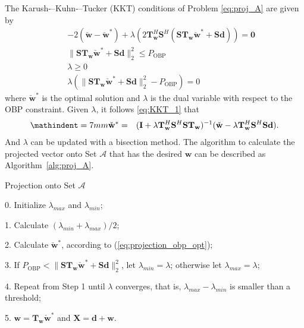 \documentclass[paper]{ieice}
\begin{document}
The Karush-–Kuhn-–Tucker (KKT) conditions \cite{ConvexOpt_Boyd} of Problem \eqref{eq:proj_A} are given by
\mathindent=0mm
\begin{eqnarray}
&&-2(\check{\mathbf{w}}-\check{\mathbf{w}}^*) + \lambda(2\mathbf{T}_{\mathbf{w}}^H\mathbf{S}^H(\mathbf{S}\mathbf{T}_{\mathbf{w}}\check{\mathbf{w}}^* + \mathbf{S}\mathbf{d})) = \mathbf{0} \label{eq:KKT_1}\\
&&\|\mathbf{S}\mathbf{T}_{\mathbf{w}}\check{\mathbf{w}}^* + \mathbf{S}\mathbf{d}\|_2^2 \leq P_{\mathrm{OBP}}\\
&&\lambda \geq 0\\
&&\lambda(\|\mathbf{S}\mathbf{T}_{\mathbf{w}}\check{\mathbf{w}}^* + \mathbf{S}\mathbf{d}\|_2^2-P_{\mathrm{OBP}}) = 0
\end{eqnarray}
where $\check{\mathbf{w}}^*$ is the optimal solution and $\lambda$ is the dual variable with respect to the OBP constraint. Given $\lambda$, it follows \eqref{eq:KKT_1} that
\begin{eqnarray}
\mathindent=7mm
\check{\mathbf{w}}^* &=& (\mathbf{I}+\lambda\mathbf{T}_{\mathbf{w}}^H\mathbf{S}^H\mathbf{S}\mathbf{T}_{\mathbf{w}})^{-1}(\check{\mathbf{w}} -\lambda \mathbf{T}_{\mathbf{w}}^H\mathbf{S}^H\mathbf{S}\mathbf{d}).
 \label{eq:projection_obp_opt}
\end{eqnarray}
And $\lambda$ can be updated with a bisection method.  The algorithm to calculate the projected vector onto Set $\mathcal{A}$ that has the desired $\mathbf{w}$ can be described as Algorithm~\ref{alg:proj_A}.


\begin{algorithm}[t]
\caption{Projection onto Set $\mathcal{A}$}\label{alg:proj_A}
\begin{algorithmic}
\item[0.] Initialize $\lambda_{max}$ and $\lambda_{min}$; 
\item[1.] Calculate $(\lambda_{min} + \lambda_{max})/2$;
\item[2.] Calculate $\check{\mathbf{w}}^*$, according to (\ref{eq:projection_obp_opt}); 
\item[3.] If $P_{\mathrm{OBP}} < \|\mathbf{S}\mathbf{T}_{\mathbf{w}}\check{\mathbf{w}}^*+\mathbf{S}\mathbf{d}\|_2^2$, let $\lambda_{min} = \lambda$; otherwise let $\lambda_{max} = \lambda$;
\item[4.] Repeat from Step 1 until $\lambda$ converges, that is, $\lambda_{max} - \lambda_{min}$ is smaller than a threshold;
\item[5.] $\mathbf{w} = \mathbf{T}_{\mathbf{w}}\check{\mathbf{w}}^*$ and $\mathbf{X} = \mathbf{d} + \mathbf{w}$.
\end{algorithmic}
\end{algorithm}
\end{document}
